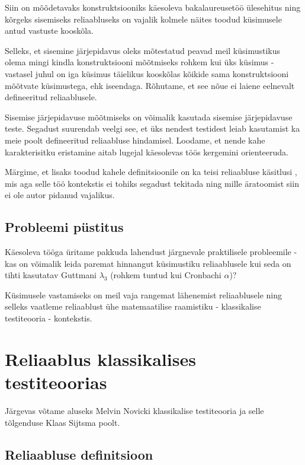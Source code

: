 \documentclass[a4paper,12pt,oneside]{article}
\numberwithin{equation}{section}
\theoremstyle{definition}
\begin{document}
Siin on mõõdetavaks konstruktsiooniks käesoleva bakalaureusetöö \"ulesehitus ning kõrgeks sisemiseks reliaabluseks on vajalik kolmele näites toodud k\"usimusele antud vastuste kooskõla. 

Selleks, et sisemine järjepidavus oleks mõtestatud peavad meil küsimustikus olema mingi kindla konstruktsiooni mõõtmiseks rohkem kui üks küsimus - vastasel juhul on iga küsimus täielikus kooskõlas kõikide sama konstruktsiooni mõõtvate küsimustega, ehk iseendaga. Rõhutame, et see nõue ei laiene eelnevalt defineeritud reliaablusele. 

Sisemise järjepidavuse mõõtmiseks on võimalik kasutada sisemise järjepidavuse teste. Segadust suurendab veelgi see, et üks nendest testidest leiab kasutamist ka meie poolt defineeritud reliaabluse hindamisel. Loodame, et nende kahe karakterisitku eristamine aitab lugejal käesolevas töös kergemini orienteeruda.

Märgime, et lisaks toodud kahele definitsioonile on ka teisi reliaabluse käsitlusi \cite{Cronbach1947}, mis aga selle töö kontekstis ei tohiks segadust tekitada ning  mille äratoomist siin ei ole autor pidanud vajalikus.


\subsection{Probleemi püstitus}

Käesoleva tööga üritame pakkuda lahendust järgnevale praktilisele probleemile - kas on võimalik leida paremat hinnangut küsimustiku reliaablusele kui seda on tihti kasutatav Guttmani $\lambda_3$ (rohkem tuntud kui Cronbachi $\alpha$)?  
 
Küsimusele vastamiseks on meil vaja  rangemat lähenemist reliaablusele ning selleks vaatleme reliaablust ühe matemaatilise raamistiku - klassikalise testiteooria - kontekstis.


\pagebreak


\section{Reliaablus klassikalises testiteoorias}
Järgevas võtame aluseks Melvin Novicki klassikalise testiteooria \cite{Novick1966a}\cite{Lord1968} ja selle tõlgenduse Klaas Sijtsma poolt. \cite[109]{Sijtsma2009}

\subsection{Reliaabluse definitsioon}
\end{document}
